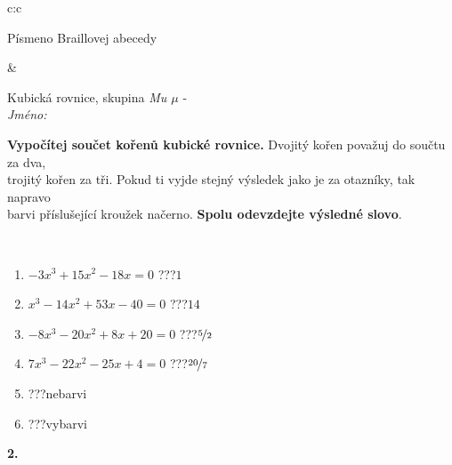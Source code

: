 \documentclass[10pt]{report}
\begin{document}
\begin{tabular}{c:c}
\begin{minipage}[c][104.5mm][t]{0.5\linewidth}
\begin{center}
\begin{minipage}{0.20\linewidth}
\begin{center}
{\small Písmeno Braillovej abecedy}
\end{center}
\end{minipage}
\end{center}
\end{minipage}
&
\begin{minipage}[c][104.5mm][t]{0.5\linewidth}
\begin{center}
\vspace{7mm}
{\huge Kubická rovnice, skupina \textit{Mu $\mu$} -}\\[5mm]
\textit{Jméno:}\phantom{xxxxxxxxxxxxxxxxxxxxxxxxxxxxxxxxxxxxxxxxxxxxxxxxxxxxxxxxxxxxxxxxx}\\[5mm]
\begin{minipage}{0.95\linewidth}
\begin{center}
\textbf{Vypočítej součet kořenů kubické rovnice.} Dvojitý kořen považuj do součtu za dva,\\trojitý kořen za tři. Pokud ti vyjde stejný výsledek jako je za otazníky, tak napravo\\barvi příslušející kroužek načerno. \textbf{Spolu odevzdejte výsledné slovo}.
\end{center}
\end{minipage}
\\[1mm]
\begin{minipage}{0.79\linewidth}
\begin{center}
\begin{varwidth}{\linewidth}
\begin{enumerate}
\Large
\item $-3x^3+15x^2-18x=0$\quad \dotfill\; ???\;\dotfill \quad $1$
\item $x^3-14x^2+53x-40=0$\quad \dotfill\; ???\;\dotfill \quad $14$
\item $-8x^3-20x^2+8x+20=0$\quad \dotfill\; ???\;\dotfill \quad $\nicefrac{5}{2}$
\item $7x^3-22x^2-25x+4=0$\quad \dotfill\; ???\;\dotfill \quad $\nicefrac{20}{7}$
\item \quad \dotfill\; ???\;\dotfill \quad nebarvi
\item \quad \dotfill\; ???\;\dotfill \quad vybarvi
\end{enumerate}
\end{varwidth}
\end{center}
\end{minipage}
\begin{minipage}{0.20\linewidth}
\begin{center}
{\Huge\bfseries 2.} \\[2mm]

\end{center}
\end{minipage}
\end{center}
\end{minipage}
\end{tabular}
\end{document}
